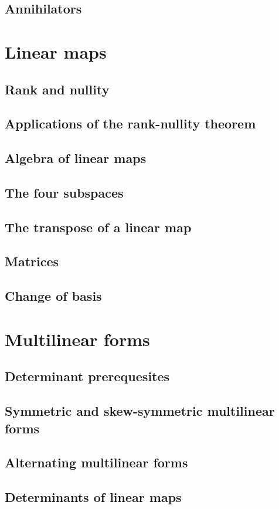 \documentclass{article}
\begin{document}
\subsection{Annihilators}
\section{Linear maps}
\subsection{Rank and nullity}
\subsection{Applications of the rank-nullity theorem}
\subsection{Algebra of linear maps}
\subsection{The four subspaces}
\subsection{The transpose of a linear map}
\subsection{Matrices}
\subsection{Change of basis}
\section{Multilinear forms}
\subsection{Determinant prerequesites}
\subsection{Symmetric and skew-symmetric multilinear forms}
\subsection{Alternating multilinear forms}
\subsection{Determinants of linear maps}
\end{document}
